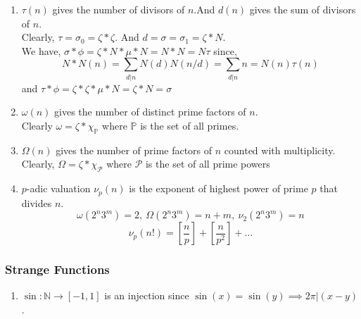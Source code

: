 \begin{enumerate}
	\item $\tau(n)$ gives the number of divisors of $n$.And $d(n)$ gives the sum of divisors of $n$.\\
		Clearly, $\tau = \sigma_0 = \zeta \ast \zeta$. And $d = \sigma = \sigma_1 = \zeta \ast N$.\\
	We have, $\sigma \ast \phi = \zeta \ast N \ast \mu \ast N =  N \ast N = N \tau$ since,
		$$ N \ast N(n)= \sum_{d|n} N(d)N(n/d) = \sum_{d|n} n = N(n) \tau(n)$$
	and $\tau \ast \phi = \zeta \ast \zeta \ast \mu \ast N = \zeta \ast N = \sigma$
	\item $\omega(n)$ gives the number of distinct prime factors of $n$.\\
	Clearly $\omega = \zeta \ast \chi_\mathbb{P}$ where $\mathbb{P}$ is the set of all primes.
	\item $\Omega(n)$ gives the number of prime factors of $n$ counted with multiplicity.
	Clearly, $\Omega = \zeta \ast \chi_\mathcal{P}$ where $\mathcal{P}$ is the set of all prime powers 
	\item $p$-adic valuation $\nu_p(n)$ is the exponent of highest power of prime $p$ that divides $n$.
	$$ \omega(2^n3^m) = 2,\ \Omega(2^n 3^m)=n+m,\ \nu_2(2^n3^m)=n$$
	$$\nu_p(n!) = \left[\frac{n}{p}\right] + \left[\frac{n}{p^2}\right] + \dots$$
\end{enumerate}
\subsubsection{Strange Functions}
\begin{enumerate}
	\item $\sin : \mathbb{N} \to [-1,1]$ is an injection since $\sin (x) = \sin (y) \implies 2\pi | (x-y)$.
\end{enumerate}
